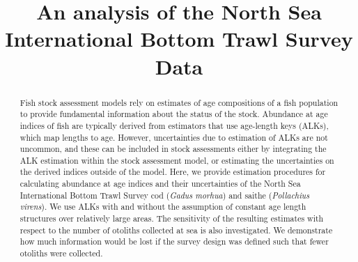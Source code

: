 \documentclass[a4paper 12pt]{article}
\title{\bf 
}
\author{}
\date{}
\numberwithin{equation}{section}
\begin{document}
\title{An analysis of the North Sea International Bottom Trawl Survey Data}

\maketitle


\begin{abstract}
Fish stock assessment models rely on estimates of age compositions of a fish population to provide fundamental information about the status of the stock. Abundance at age indices of fish are typically derived from estimators that use age-length keys (ALKs), which map lengths to age. However, uncertainties due to estimation of ALKs are not uncommon, and these can be included in stock assessments either by integrating the ALK estimation within the stock assessment model, or estimating the uncertainties on the derived indices outside of the model. Here, we provide estimation procedures for calculating abundance at age indices and their uncertainties of the North Sea International Bottom Trawl Survey cod (\textit{Gadus morhua}) and saithe (\textit{Pollachius virens}). We use ALKs with and without the assumption of constant age length structures over relatively large areas. The sensitivity of the resulting estimates with respect to the number of otoliths collected at sea is also investigated. We demonstrate how much information would be lost if the survey design was defined such that fewer otoliths were collected.



\end{abstract}
\end{document}

